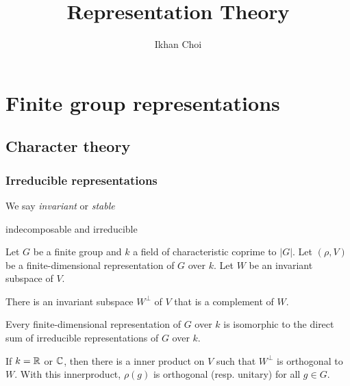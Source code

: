 \documentclass{../note}
\begin{document}
\title{Representation Theory}
\author{Ikhan Choi}
\maketitle
\tableofcontents

\part{Finite group representations}
\chapter{Character theory}

\section{Irreducible representations}
\begin{prb}
\end{prb}

\begin{prb}
\end{prb}

\begin{prb}[Subrepresentations]
We say \emph{invariant} or \emph{stable}
\end{prb}

\begin{prb}
indecomposable and irreducible
\end{prb}

\begin{prb}
Let $G$ be a finite group and $k$ a field of characteristic coprime to $|G|$.
Let $(\rho,V)$ be a finite-dimensional representation of $G$ over $k$.
Let $W$ be an invariant subspace of $V$.
\begin{parts}
\item There is an invariant subspace $W^\perp$ of $V$ that is a complement of $W$.
\item Every finite-dimensional representation of $G$ over $k$ is isomorphic to the direct sum of irreducible representations of $G$ over $k$.
\item If $k=\mathbb{R}$ or $\mathbb{C}$, then there is a inner product on $V$ such that $W^\perp$ is orthogonal to $W$. With this innerproduct, $\rho(g)$ is orthogonal (resp. unitary) for all $g\in G$.
\end{parts}
\end{prb}
\end{document}
